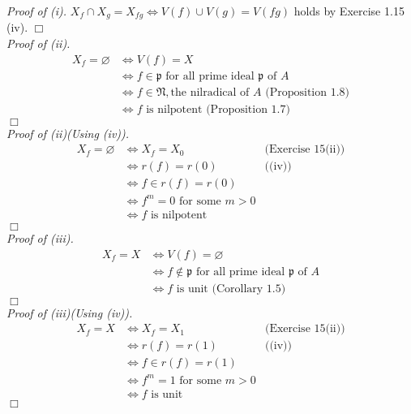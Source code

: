 \documentclass{article}
\begin{document}
\emph{Proof of (i).}
$X_f \cap X_g = X_{fg} \Longleftrightarrow V(f) \cup V(g) = V(fg)$ holds by Exercise 1.15 (iv).
$\Box$ \\



\emph{Proof of (ii).}
\begin{align*}
X_f = \varnothing
&\Longleftrightarrow V(f) = X \\
&\Longleftrightarrow f \in \mathfrak{p}
\text{ for all prime ideal $\mathfrak{p}$ of $A$} \\
&\Longleftrightarrow f \in \mathfrak{N},
\text{the nilradical of $A$ (Proposition 1.8)} \\
&\Longleftrightarrow f \text{ is nilpotent (Proposition 1.7)}
\end{align*}
$\Box$ \\



\emph{Proof of (ii)(Using (iv)).}
\begin{align*}
X_f = \varnothing
&\Longleftrightarrow X_f = X_0
  &\text{(Exercise 15(ii))} \\
&\Longleftrightarrow r(f) = r(0)
  &\text{((iv))} \\
&\Longleftrightarrow f \in r(f) = r(0)
  & \\
&\Longleftrightarrow f^m = 0 \text{ for some $m > 0$}
  & \\
&\Longleftrightarrow f \text{ is nilpotent}
  &
\end{align*}
$\Box$ \\



\emph{Proof of (iii).}
\begin{align*}
X_f = X
&\Longleftrightarrow V(f) = \varnothing \\
&\Longleftrightarrow f \not\in \mathfrak{p}
\text{ for all prime ideal $\mathfrak{p}$ of $A$} \\
&\Longleftrightarrow f \text{ is unit (Corollary 1.5)}
\end{align*}
$\Box$ \\

\emph{Proof of (iii)(Using (iv)).}
\begin{align*}
X_f = X
&\Longleftrightarrow X_f = X_1
  &\text{(Exercise 15(ii))} \\
&\Longleftrightarrow r(f) = r(1)
  &\text{((iv))} \\
&\Longleftrightarrow f \in r(f) = r(1)
  & \\
&\Longleftrightarrow f^m = 1 \text{ for some $m > 0$}
  & \\
&\Longleftrightarrow f \text{ is unit}
  &
\end{align*}
$\Box$ \\
\end{document}
